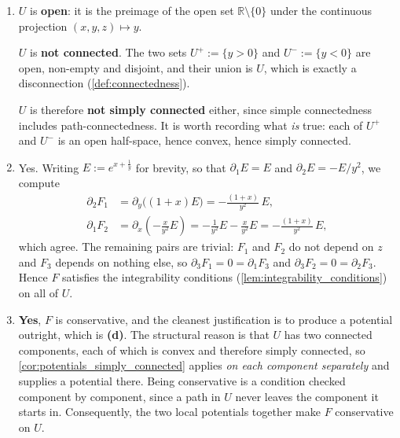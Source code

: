 \begin{exercisesolution}
\label{sol:jossen_potential_on_disconnected_domain}
\begin{enumerate}[label=\textbf{(\alph*)}]
  \item $U$ is \textbf{open}: it is the preimage of the open set $\mathbb{R}\setminus\{0\}$ under
    the continuous projection $(x,y,z)\mapsto y$.

    $U$ is \textbf{not connected}. The two sets $U^+ := \{y > 0\}$ and $U^- := \{y < 0\}$ are open,
    non-empty and disjoint, and their union is $U$, which is exactly a disconnection
    (\cref{def:connectedness}).

    $U$ is therefore \textbf{not simply connected} either, since simple connectedness includes
    path-connectedness. It is worth recording what \emph{is} true: each of $U^+$ and $U^-$ is an
    open half-space, hence convex, hence simply connected.

  \item Yes. Writing $E := e^{x+\frac1y}$ for brevity, so that $\partial_1 E = E$ and
    $\partial_2 E = -E/y^2$, we compute
    \begin{align*}
      \partial_2 F_1 &= \partial_y\big((1+x)E\big) = -\frac{(1+x)}{y^2}\,E, \\
      \partial_1 F_2 &= \partial_x\left(-\frac{x}{y^2}E\right)
        = -\frac{1}{y^2}E - \frac{x}{y^2}E = -\frac{(1+x)}{y^2}\,E,
    \end{align*}
    which agree. The remaining pairs are trivial: $F_1$ and $F_2$ do not depend on $z$ and $F_3$
    depends on nothing else, so $\partial_3F_1 = 0 = \partial_1F_3$ and
    $\partial_3F_2 = 0 = \partial_2F_3$. Hence $F$ satisfies the integrability conditions
    (\cref{lem:integrability_conditions}) on all of $U$.

  \item \textbf{Yes}, $F$ is conservative, and the cleanest justification is to produce a potential
    outright, which is \textbf{(d)}. The structural reason is that $U$ has two connected
    components, each of which is convex and therefore simply connected, so
    \cref{cor:potentials_simply_connected} applies \emph{on each component separately} and supplies
    a potential there. Being conservative is a condition checked component by component, since a
    path in $U$ never leaves the component it starts in. Consequently, the two local potentials
    together make $F$ conservative on $U$.


\end{enumerate}
\end{exercisesolution}
